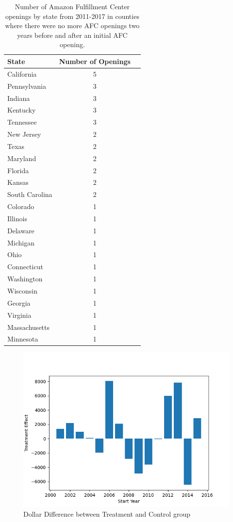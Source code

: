 \documentclass[11pt]{article}
\begin{document}
\begin{table}[H]
\centering
\begin{tabular}[H]{lcc}
\toprule
State&Number of Openings\\
\midrule
California	&5\\
Pennsylvania	&3\\
Indiana	&3\\
Kentucky	&3\\
Tennessee	&3\\
New Jersey	&2\\
Texas	&2\\
Maryland	&2\\
Florida	&2\\
Kansas	&2\\
South Carolina	&2\\
Colorado	&1\\
Illinois	&1\\
Delaware	&1\\
Michigan	&1\\
Ohio	&1\\
Connecticut	&1\\
Washington	&1\\
Wisconsin	&1\\
Georgia	&1\\
Virginia	&1\\
Massachusetts	&1\\
Minnesota	&1\\
\bottomrule
\end{tabular}
\caption{Number of Amazon Fulfillment Center openings by state from 2011-2017 in counties where there were no more AFC openings two years before and after an initial AFC opening.}
\end{table}%

\begin{figure}
    \centering
    \includegraphics[width=13cm]{Treatment_effect_mob2.png}
    \caption{Dollar Difference between Treatment and Control group}
\end{figure}
\end{document}
